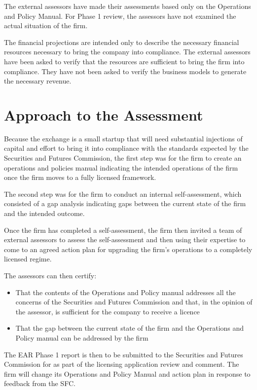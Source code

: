\documentclass[]{report}
\begin{document}
The external assessors have made their assessments based only on the
Operations and Policy Manual.  For Phase 1 review, the assessors have
not examined the actual situation of the firm.

The financial projections are intended only to describe the necessary
financial resources necessary to bring the company into compliance.
The external assessors have been asked to verify that the resources
are sufficient to bring the firm into compliance.  They have not been
asked to verify the business models to generate the necessary revenue.

\section{Approach to the Assessment}

Because the exchange is a small startup that will need substantial
injections of capital and effort to bring it into compliance with the
standards expected by the Securities and Futures Commission, the first
step was for the firm to create an operations and policies manual
indicating the intended operations of the firm once the firm moves to
a fully licensed framework.

The second step was for the firm to conduct an internal
self-assessment, which consisted of a gap analysis indicating gaps
between the current state of the firm and the intended outcome.

Once the firm has completed a self-assessment, the firm then invited a
team of external assessors to assess the self-assessment and then
using their expertise to come to an agreed action plan for upgrading
the firm's operations to a completely licensed regime.

The assessors can then certify:

\begin{itemize}
  \item That the contents of the Operations and Policy manual
    addresses all the concerns of the Securities and Futures
    Commission and that, in the opinion of the assessor, is sufficient
    for the company to receive a licence
  \item That the gap between the current state of the firm and the
    Operations and Policy manual can be addressed by the firm
\end{itemize}

The EAR Phase 1 report is then to be submitted to the Securities and
Futures Commission for as part of the licensing application review and
comment.  The firm will change its Operations and Policy
Manual and action plan in response to feedback from the SFC.
\end{document}
